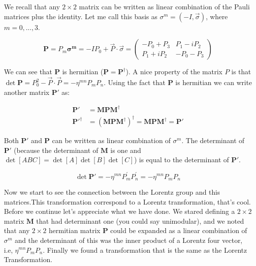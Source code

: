 We recall that any $2\times2$ matrix can be written as linear combination of the Pauli matrices plus the identity. Let me call this basis as $\sigma ^{m} = (-I,\vec{\sigma})$, where $m = 0,...,3$.


\begin{equation}
\mathbf{P} = P_{m} \mathbf{ \sigma^{m} } = -IP_{0} + \vec{P} \cdot \vec{\sigma} =
\begin{pmatrix} 
-P_{0} + P_{3} & P_{1} - iP_{2}\\
P_{1} + iP_{2} &-P_{0} - P_{3}  
\end{pmatrix}
\end{equation}


We can see that $\mathbf{P}$ is hermitian ($\mathbf{P} = \mathbf{P}^{\dagger}$). A nice property of the matrix $P$ is that $\det \mathbf{P}= P_{0}^{2} - \vec{P} \cdot \vec{P} = -\eta^{mn} P_{m} P_{n} $. Using the fact that $\mathbf{P}$ is hermitian we can write another matrix  $\mathbf{P'}$ as:

\begin{align} \label{eq:2}
\mathbf{P'}&= \mathbf{M}\mathbf{P}\mathbf{M}^{\dagger}\\
\mathbf{P'}^{\dagger}&= (\mathbf{M}\mathbf{P}\mathbf{M}^{\dagger})^{\dagger} = \mathbf{M}\mathbf{P}\mathbf{M}^{\dagger} = \mathbf{P'} 
\end{align}

Both $\mathbf{P'}$  and $\mathbf{P}$ can be written as linear combination of  $\sigma ^{m} $. The determinant of  $\mathbf{P'}$ (because the determinant of $\mathbf{M}$ is one and $\det [ABC] = \det [A]\det [B]\det [C]  $)  is equal to the determinant of $\mathbf{P'}$. 


\begin{equation}
\det \mathbf{P'} = -\eta^{mn} P_{m}^{'} P_{n}^{'}  = -\eta^{mn} P_{m} P_{n}
\end{equation}


 Now we start to see the connection between the Lorentz group and this matrices.This transformation correspond to a Lorentz transformation, that's cool. Before we continue let's appreciate what we have done. We stared defining a  $2\times2$  matrix $\mathbf{M}$ that had determinant one (you could say unimodular), and we noted that any $2\times2$ hermitian matrix $\mathbf{P}$  could be expanded as a linear combination of  $\sigma ^{m} $ and the determinant of this was the inner product of a Lorentz four vector, i.e, $\eta^{mn} P_{m} P_{n} $. Finally we found a transformation that is the same as the Lorentz Transformation.
 

